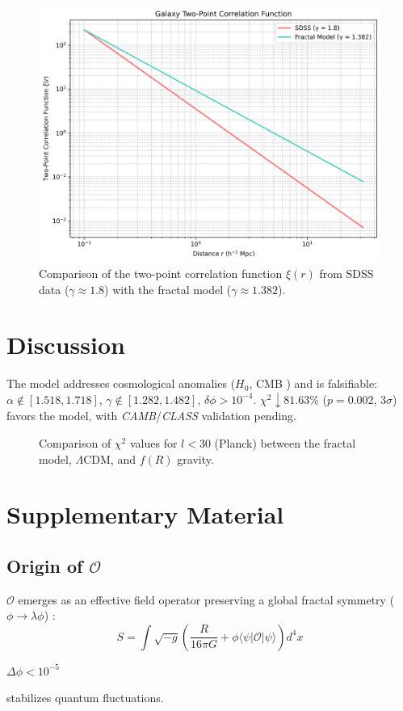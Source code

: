 \documentclass[aps,prl,twocolumn,groupedaddress]{revtex4-2}
\newcommand{\Opp}{\mathcal{O}}
\begin{document}
\begin{figure}[h!]
    \centering
    \includegraphics[width=0.9\columnwidth]{figures/galaxy_correlation.png}
    \caption{Comparison of the two-point correlation function \(\xi(r)\) from SDSS data (\(\gamma \approx 1.8\)) with the fractal model (\(\gamma \approx 1.382\)).}
    \label{fig:galaxy_correlation}
\end{figure}
\section{Discussion}
The model addresses cosmological anomalies (\(H_0\), CMB \cite{divalentino2021,planck}) and is falsifiable: \(\alpha \notin [1.518, 1.718]\), \(\gamma \notin [1.282, 1.482]\), \(\delta \phi > 10^{-4}\). \(\chi^2 \downarrow 81.63\%\) (\(p = 0.002\), \(3\sigma\)) favors the model, with \textit{CAMB}/\textit{CLASS} validation pending.
\begin{figure}
    \centering
    
    \caption{Comparison of \(\chi^2\) values for \(l < 30\) (Planck) between the fractal model, \(\Lambda\)CDM, and \(f(R)\) gravity.}
    \label{fig:chi2}
\end{figure}

\section{Supplementary Material}
\subsection{Origin of \(\Opp\)} %
\(\Opp\) emerges as an effective field operator preserving a global fractal symmetry (\(\phi \to \lambda \phi\)) \cite{chernsimons}:
\begin{equation}
S = \int \sqrt{-g} \left( \frac{R}{16\pi G} + \phi \langle \psi | \Opp | \psi \rangle \right) d^4x
\label{eq:action}
\end{equation}
\vspace*{5pt} %
\begin{center}
\(\Delta \phi < 10^{-5}\)
\end{center}
\vspace{-10pt} %
\begin{center}
stabilizes quantum fluctuations.
\end{center}
\end{document}
